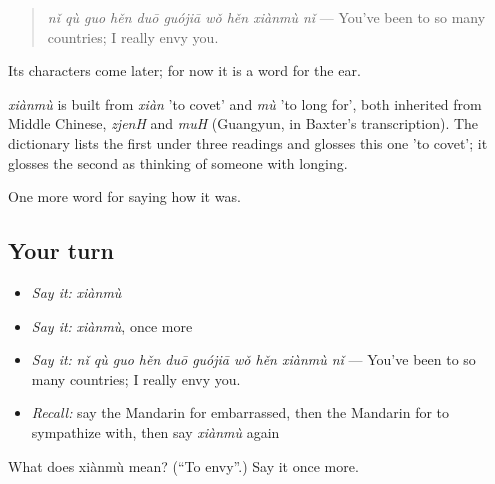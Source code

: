 \begin{quote}
\emph{nǐ qù guo hěn duō guójiā wǒ hěn xiànmù nǐ} — You've been to so many countries; I really envy you.
\end{quote}

Its characters come later; for now it is a word for the ear.

\begin{cousinweb}
\emph{xiànmù} is built from \emph{xiàn} 'to covet' and \emph{mù} 'to long for', both inherited from Middle Chinese, \emph{zjenH} and \emph{muH} (Guangyun, in Baxter's transcription). The dictionary lists the first under three readings and glosses this one 'to covet'; it glosses the second as thinking of someone with longing.
\end{cousinweb}

\begin{grammarlens}[title={What you've built}]
One more word for saying how it was.
\end{grammarlens}

\subsection*{Your turn}
\begin{itemize}
\raggedright
  \item \emph{Say it:} \emph{xiànmù}
  \item \emph{Say it:} \emph{xiànmù}, once more
  \item \emph{Say it:} \emph{nǐ qù guo hěn duō guójiā wǒ hěn xiànmù nǐ} — You've been to so many countries; I really envy you.
  \item \emph{Recall:} say the Mandarin for embarrassed, then the Mandarin for to sympathize with, then say \emph{xiànmù} again
\end{itemize}

\begin{tcolorbox}[breakable,colback=teal!4,colframe=teal!35!black,title={Before you move on}]
What does xiànmù mean? (\textquotedblleft{}To envy\textquotedblright{}.) Say it once more.
\end{tcolorbox}
